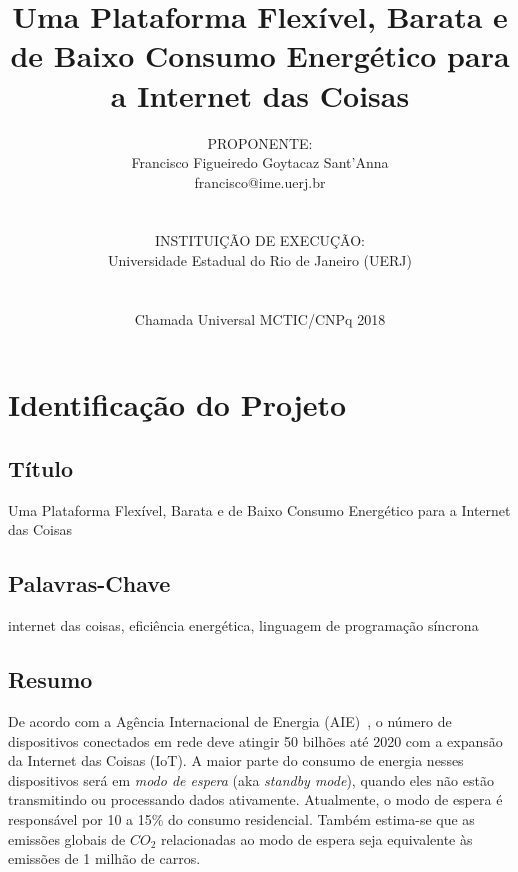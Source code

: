 \documentclass[titlepage,12pt]{article}
\title{ Uma Plataforma Flexível, Barata e de Baixo Consumo Energético para a
        Internet das Coisas }
\author{PROPONENTE:                                     \\
Francisco Figueiredo Goytacaz Sant'Anna                 \\
francisco@ime.uerj.br                                   \\
\\\\
INSTITUIÇÃO DE EXECUÇÃO:                                \\
Universidade Estadual do Rio de Janeiro (UERJ)          \\
\\\\
Chamada Universal MCTIC/CNPq 2018 
}
\begin{document}
 

\maketitle



\section{Identificação do Projeto}

\subsection{Título}

Uma Plataforma Flexível, Barata e de Baixo Consumo Energético para a Internet
das Coisas


\subsection{Palavras-Chave}

internet das coisas, eficiência energética, linguagem de programação síncrona


\subsection{Resumo}

De acordo com a Agência Internacional de Energia (AIE)~\cite{iea.data}, o
número de dispositivos conectados em rede deve atingir 50 bilhões até 2020 com
a expansão da Internet das Coisas (IoT).
A maior parte do consumo de energia nesses dispositivos será em
\emph{modo de espera} (aka \emph{standby mode}), quando eles não estão
transmitindo ou processando dados ativamente.
Atualmente, o modo de espera é responsável por 10 a 15\% do consumo
residencial.
Também estima-se que as emissões globais de $CO_2$ relacionadas ao modo de
espera seja equivalente às emissões de 1 milhão de carros.
\end{document}
